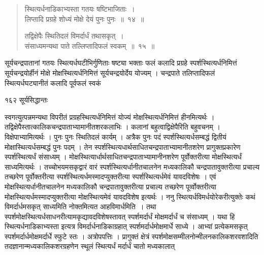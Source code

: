 \documentclass[11pt, openany]{book}
\begin{document}
\begin{quote}
  {\ssi स्थित्यर्धनाडिकाभ्यस्ता गतयः षष्टिभाजिताः~।\\
लिप्तादि प्रग्रहे शोध्यं मोक्षे देयं पुनः पुनः~॥~१४~॥

तद्विक्षेपैः स्थितिदलं विमर्दार्धं तथासकृत्~।\\
संसाध्यमन्यथा पाते तल्लिप्तादिफलं स्वकम्~॥~१५~॥}
\end{quote}

\begin{sloppypar}
 सूर्यचन्द्रपातानां गतयः स्थित्यर्धघटीभिर्गुणिताः षष्ट्या भक्ताः फलं कलादि प्रग्रहे स्पर्शस्थित्यर्धनिमित्तं सूर्यचन्द्रयोर्हीनं मोक्षे मोक्षस्थित्यर्धनिमित्तं सूर्यचन्द्रयोर्देय योज्यम् । चन्द्रपाते तलिप्तादिफलं स्थित्यर्धघट्यानीतं कलादि पूर्वफलं स्वकं
\end{sloppypar}


\newpage


\noindent  १६२ \hspace{4cm} सूर्यसिद्धान्तः 
\vspace{1cm}

\begin{sloppypar}
\noindent स्वगत्युत्पन्नमन्यथा विपरीतं प्रग्रहस्थित्यर्धनिमित्तं योज्यं मोक्षस्थित्यर्धनिमित्तं हीनमित्यर्थः । तद्विक्षेपैस्तात्कालिकचन्द्रपाताभ्यामानीतशरकलाभिः । कलानां बहुत्वाद्विक्षेपैरिति बहुवचनम् । विक्षेपाभ्यामित्यर्थः । पुनः पुनः स्थितिदलं कार्यम् । अत्रैक पुनः पदं स्पर्शस्थित्यर्धसम्बद्धं द्वितीयं मोक्षास्थित्यर्धसम्बद्धं पुनः पदम् । तेन स्पर्शस्थित्यधार्थसाधितचन्द्रपाताभ्यामानीतशरेण प्रागुक्तप्रकारेण स्पर्शस्थित्यर्धं संसाध्यम् । मोक्षस्थित्यार्धार्थसाधितचन्द्रपाताभ्यामानीनशरेण पूर्वोक्तरीत्या मोक्षस्थित्यर्धं साध्यमित्यर्थः । तच्चोभयमसकृद्वारं वारं स्पर्शस्थित्यर्धानीतचालनेन मध्यकालिकौ चन्द्रपातावुक्तरीत्या प्रचाल्य तच्छरेण पूर्वोक्तरीत्या स्पर्शस्थित्यर्धमस्मादप्युक्तरीत्या स्पर्शस्थित्यर्धमेवं यावदविशेषः । एवं मोक्षस्थित्यर्धानीतचालनेन मध्यकालिकौ चन्द्रपातावुक्तरीत्या प्रचाल्य तच्छरेण पूर्व्वोक्तरीत्या मोक्षस्थित्यर्धमस्मादप्युक्तरीत्या मोक्षस्थित्यमेवं यावदविशेष इत्यर्थः । ननु स्थित्यर्धविमर्धयोरेकरीत्युक्तेः कथं विमर्दार्धमसकृत् साध्यमिति नोक्तमित्यत आह\textendash विमार्धमिति~। तथा स्पर्शमोक्षस्थित्यर्धसाधनरीत्यामकृद्यावदविशेषस्तावत् स्पर्शमर्दार्धं मोक्षमर्दार्धं च संसाध्यम् । यथा हि स्थित्यर्धनाडिकाभ्यस्ता इत्यत्र विमर्दार्धनाडिकाग्रहात् स्पर्शमर्दार्धमोक्षमार्धे साध्ये । आभ्यां प्रत्येकमसकृत् स्पर्शमर्दार्धमोक्षमर्दार्धे स्फुटे स्तः । अत्रोपपत्तिः । प्रागुक्तं क्षेत्रं  स्पर्शमोक्षसम्मीलनोन्मीलनकालिकशरवशादिति तदज्ञानान्मध्यकालिकशरग्रहणेन स्थूलं स्थित्यर्धं मर्दार्धं चातो मध्यकालात्
\end{sloppypar}
\end{document}
